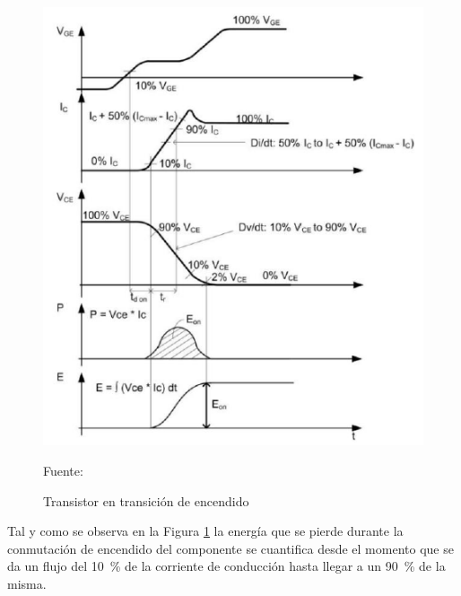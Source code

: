\begin{figure}[h]
\centering
\includegraphics[scale=0.65]{Figuras/on.png}
\caption{Transistor en transición de encendido}
Fuente: \cite{beltran}
\label{encendido}
\end{figure}

Tal y como se observa en la Figura \ref{encendido} la energía que se pierde durante la conmutación de encendido del componente se cuantifica desde el momento que se da un flujo del \SI{10}{\percent} de la corriente de conducción hasta llegar a un \SI{90}{\percent} de la misma.   

